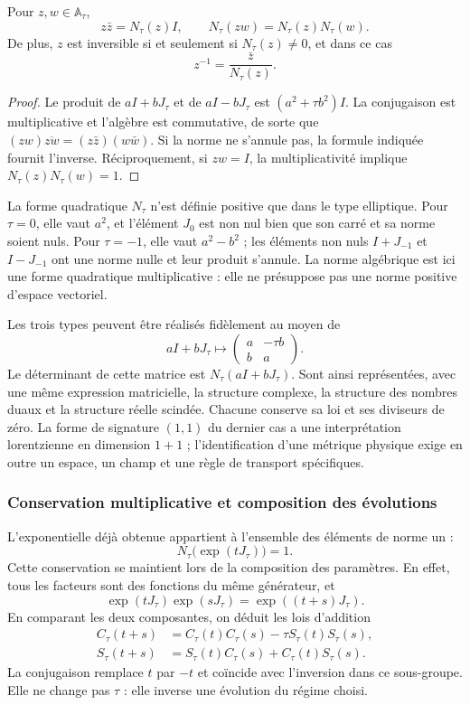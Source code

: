 \begin{proposition}
\label{x_reciprocidad:trit-ampl-prop-norma}
Pour \(z,w\in\mathbb A_\tau\),
\[
 z\bar z=N_\tau(z)I,\qquad
 N_\tau(zw)=N_\tau(z)N_\tau(w).
\]
De plus, \(z\) est inversible si et seulement si \(N_\tau(z)\ne0\), et dans ce cas
\[
 z^{-1}=\frac{\bar z}{N_\tau(z)}.
\]
\end{proposition}
\begin{proof}
Le produit de \(aI+bJ_\tau\) et de \(aI-bJ_\tau\) est
\((a^2+\tau b^2)I\). La conjugaison est multiplicative et l'algèbre est
commutative, de sorte que
\((zw)\overline{zw}=(z\bar z)(w\bar w)\). Si la norme ne s'annule pas, la
formule indiquée fournit l'inverse. Réciproquement, si \(zw=I\), la
multiplicativité implique \(N_\tau(z)N_\tau(w)=1\).
\end{proof}

La forme quadratique \(N_\tau\) n'est définie positive que dans le type elliptique. Pour \(\tau=0\), elle vaut \(a^2\), et l'élément \(J_0\) est non nul bien que son carré et sa norme soient nuls. Pour \(\tau=-1\), elle vaut \(a^2-b^2\) ; les éléments non nuls \(I+J_{-1}\) et \(I-J_{-1}\) ont une norme nulle et leur produit s'annule. La norme algébrique est ici une forme quadratique multiplicative : elle ne présuppose pas une norme positive d'espace vectoriel.

Les trois types peuvent être réalisés fidèlement au moyen de
\[
 aI+bJ_\tau\longmapsto
 \begin{pmatrix}a&-\tau b\\b&a\end{pmatrix}.
\]
Le déterminant de cette matrice est \(N_\tau(aI+bJ_\tau)\). Sont ainsi
représentées, avec une même expression matricielle, la structure
complexe, la structure des nombres duaux et la structure réelle scindée.
Chacune conserve sa loi et ses diviseurs de zéro. La forme de signature
\((1,1)\) du dernier cas a une interprétation lorentzienne en dimension
\(1+1\) ; l'identification d'une métrique physique exige en outre un espace,
un champ et une règle de transport spécifiques.

\subsubsection{Conservation multiplicative et composition des évolutions}
\label{x_reciprocidad:trit-ampl-evoluciones}

L'exponentielle déjà obtenue appartient à l'ensemble des éléments de norme un :
\[
 N_\tau\bigl(\exp(tJ_\tau)\bigr)=1.
\]
Cette conservation se maintient lors de la composition des paramètres. En effet, tous les
facteurs sont des fonctions du même générateur, et
\[
 \exp(tJ_\tau)\exp(sJ_\tau)=\exp((t+s)J_\tau).
\]
En comparant les deux composantes, on déduit les lois d'addition
\begin{align}
 C_\tau(t+s)&=C_\tau(t)C_\tau(s)-\tau S_\tau(t)S_\tau(s),\\
 S_\tau(t+s)&=S_\tau(t)C_\tau(s)+C_\tau(t)S_\tau(s).
\end{align}
La conjugaison remplace \(t\) par \(-t\) et coïncide avec l'inversion dans
ce sous-groupe. Elle ne change pas \(\tau\) : elle inverse une évolution du régime
choisi.

